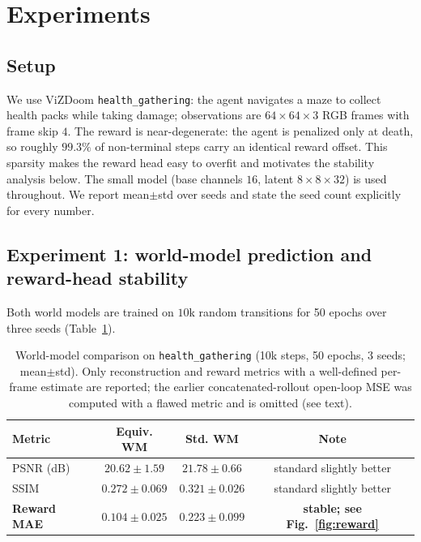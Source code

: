 \documentclass[sigconf,anonymous]{acmart}
\begin{document}
\section{Experiments}\label{sec:exp}

\subsection{Setup}
We use ViZDoom \texttt{health\_gathering}: the agent navigates a maze to
collect health packs while taking damage; observations are $64\times64\times3$
RGB frames with frame skip $4$. The reward is near-degenerate: the agent is
penalized only at death, so roughly $99.3\%$ of non-terminal steps carry an
identical reward offset. This sparsity makes the reward head easy to overfit
and motivates the stability analysis below. The small model (base channels
$16$, latent $8\times8\times32$) is used throughout. We report
mean$\pm$std over seeds and state the seed count explicitly for every
number.

\subsection{Experiment 1: world-model prediction and reward-head stability}
Both world models are trained on $10$k random transitions for 50 epochs over
three seeds (Table~\ref{tab:wm}).

\begin{table}[t]
\centering
\caption{World-model comparison on \texttt{health\_gathering} (10k steps,
50 epochs, 3 seeds; mean$\pm$std). Only reconstruction and reward metrics
with a well-defined per-frame estimate are reported; the earlier
concatenated-rollout open-loop MSE was computed with a flawed metric and is
omitted (see text).}
\label{tab:wm}
\small\setlength{\tabcolsep}{4pt}
\begin{tabular}{@{}lccc@{}}
\toprule
Metric & Equiv. WM & Std. WM & Note \\
\midrule
PSNR (dB)            & $20.62\pm1.59$ & $21.78\pm0.66$ & standard slightly better \\
SSIM                 & $0.272\pm0.069$ & $0.321\pm0.026$ & standard slightly better \\
\textbf{Reward MAE}  & $\mathbf{0.104\pm0.025}$ & $0.223\pm0.099$ & \textbf{stable; see Fig.~\ref{fig:reward}} \\
\bottomrule
\end{tabular}
\end{table}
\end{document}
